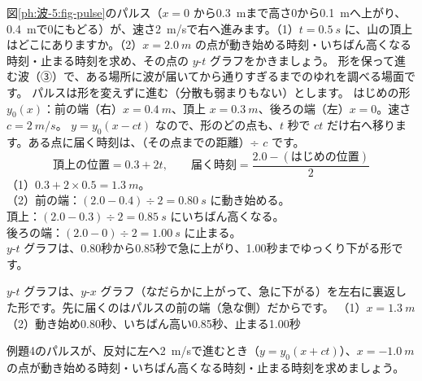 \label{ph:波-5:ex4}
\begin{phreidai}
図\ref{ph:波-5:fig-pulse}のパルス（$x=0$ から\qty{0.3}{m}まで高さ0から\qty{0.1}{m}へ上がり、\qty{0.4}{m}で0にもどる）が、速さ\qty{2}{m/s}で右へ進みます。（1）$t=\qty{0.5}{s}$ に、山の頂上はどこにありますか。（2）$x=\qty{2.0}{m}$ の点が動き始める時刻・いちばん高くなる時刻・止まる時刻を求め、その点の $y$-$t$ グラフをかきましょう。
\phbamen
形を保って進む波（③）で、ある場所に波が届いてから通りすぎるまでのゆれを調べる場面です。
\phmushi
パルスは形を変えずに進む（分散も弱まりもない）とします。
\phzu
はじめの形 $y_0(x)$：前の端（右）$x=\qty{0.4}{m}$、頂上 $x=\qty{0.3}{m}$、後ろの端（左）$x=0$。速さ $c=\qty{2}{m/s}$。
\phriyu
$y=y_0(x-ct)$ なので、形のどの点も、$t$ 秒で $ct$ だけ右へ移ります。ある点に届く時刻は、（その点までの距離）÷ $c$ です。
\phtateru
\[\text{頂上の位置}=0.3+2t,\qquad\text{届く時刻}=\frac{2.0-(\text{はじめの位置})}{2}\]
\phtoku
（1）$0.3+2\times0.5=\qty{1.3}{m}$。\\
（2）前の端：$(2.0-0.4)\div2=\qty{0.80}{s}$ に動き始める。\\
頂上：$(2.0-0.3)\div2=\qty{0.85}{s}$ にいちばん高くなる。\\
後ろの端：$(2.0-0)\div2=\qty{1.00}{s}$ に止まる。\\
$y$-$t$ グラフは、0.80秒から0.85秒で急に上がり、1.00秒までゆっくり下がる形です。
\par\smallskip\noindent{}
\phtashikame
$y$-$t$ グラフは、$y$-$x$ グラフ（なだらかに上がって、急に下がる）を左右に裏返した形です。先に届くのはパルスの前の端（急な側）だからです。
\kotae （1）$x=\qty{1.3}{m}$（2）動き始め0.80秒、いちばん高い0.85秒、止まる1.00秒
\end{phreidai}
\begin{jibun}
例題4のパルスが、反対に左へ\qty{2}{m/s}で進むとき（$y=y_0(x+ct)$）、$x=\qty{-1.0}{m}$ の点が動き始める時刻・いちばん高くなる時刻・止まる時刻を求めましょう。
\end{jibun}

